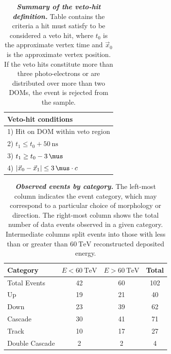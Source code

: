 \begin{table}[t!]
	\centering
	\begin{tabular}{l}  %
		Veto-hit conditions \\ [0.5ex] %
		\toprule                    %
		1) Hit on DOM within veto region \\
		2) $t_1 \leq t_0+\SI{50}\ns$  \\
		3) $t_1 \geq t_0-\SI{3}\mus$  \\
		4) $\left|\vec{x}_0 - \vec{x}_1\right| \leq \SI{3}\mus \cdot c$ \\
	\end{tabular}
	\internallinenumbers
	\caption{\textbf{\textit{Summary of the veto-hit definition.}} Table contains the criteria a hit must satisfy to be considered a veto hit, where $t_0$ is the approximate vertex time and $\vec{x}_0$ is the approximate vertex position.
		If the veto hits constitute more than three photo-electrons or are distributed over more than two DOMs, the event is rejected from the sample.}\label{tbl:veto_hits}  %
\end{table}

\begin{table}[h!]
	\begin{minipage}{\linewidth}
		\begin{tabular}{l | c c | c}
			\toprule
			Category & $E < \SI{60}\TeV$ & $E > \SI{60}\TeV$ & Total \\
			\midrule
			Total Events & 42 & 60 & 102 \\
			\midrule
			Up	    & 19 & 21 & 40 \\
			Down	& 23 & 39 & 62 \\
			\midrule
			Cascade	& 30 & 41 & 71 \\
			Track	& 10 & 17 & 27 \\
			Double Cascade & 2 & 2 & 4 \\
			\bottomrule
		\end{tabular}
	\end{minipage}
	\begin{minipage}{\linewidth}
		\internallinenumbers
		\caption{\textbf{\textit{Observed events by category.}}
			The left-most column indicates the event category, which may correspond to a particular choice of morphology or direction.
			The right-most column shows the total number of data events observed in a given category.
			Intermediate columns split events into those with less than or greater than $\SI{60}\TeV$ reconstructed deposited energy.
		}
		\label{tbl:observed_events}
	\end{minipage}
\end{table}

